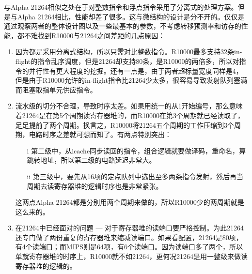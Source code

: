 与Alpha 21264相似之处在于对整数指令和浮点指令采用了分离式的处理方案。但是与Alpha 21264相比，性能却差了很多。这与微结构的设计是分不开的。仅仅是通过观察两者的整体设计图以及一些最基本的参数，不考虑转移预测率和访存的性能，都不难找到R10000与21264之间差距的几点原因：
\begin{enumerate}[label=(\alph*)]
	\item 因为都是采用分离式结构，所以只需对比整数指令。R10000最多支持32条in-flight的指令乱序调度，但是21264却支持80条，是R10000的两倍多，所以对指令的并行性有更大程度的挖掘。还有一点是，由于两者超标量宽度同样是4，但是由于R10000允许的in-flight指令比21264少太多，很容易导致发射队列塞满而阻塞取指单元供应指令。
	\item 流水级的切分不合理，导致时序太差。如果用统一的从1开始编号，那么意味着21264是在第5个周期读寄存器堆的，而R10000在第3个周期就已经读取了，足足提前了两个周期。换言之，R10000将21264五个周期的工作压缩到3个周期，电路时序之差就可想而知了。有两点特别突出：
	\begin{enumerate}
		\item[i] 第二级中，从icache同步读回的指令，组合逻辑就要做译码，重命名，算跳转地址，所以第二级的电路延迟非常大。
		\item[ii] 第三级中，要先从16项的定点队列中选出至多两条指令发射，然后再当周期去读寄存器堆的逻辑时序也是非常紧张。
	\end{enumerate}

	这两点Alpha 21264都是分别用两个周期来做的，所以R10000少的两周期就是这么来的。
	\item 在21264中已经面对的问题 --- 对于寄存器堆的读端口要严格控制。为此21264还专门做了两份重复的寄存器堆来缩减读端口。如果看配置，21264是80项，有4个读端口；而MIPS则是64项，有6个读端口。因为读端口多了两个，所以单就寄存器堆的时序上，R10000就不如21264，更何况21264是用一整级来做读寄存器堆的逻辑的。
\end{enumerate}

